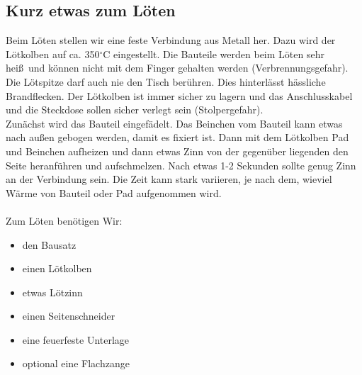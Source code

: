 \documentclass[a4paper]{article}
\begin{document}
\subsection{Kurz etwas zum Löten}
Beim Löten stellen wir eine feste Verbindung aus Metall her. Dazu wird der Lötkolben auf ca. 350$^{\circ}$C eingestellt. Die Bauteile werden beim Löten sehr hei\ss \ und können nicht mit dem Finger gehalten werden (Verbrennungsgefahr). Die Lötspitze darf auch nie den Tisch berühren. Dies hinterlässt hässliche Brandflecken. Der Lötkolben ist immer sicher zu lagern und das Anschlusskabel und die Steckdose sollen sicher verlegt sein (Stolpergefahr).\\
Zunächst wird das Bauteil eingefädelt. Das Beinchen vom Bauteil kann etwas nach au\ss en gebogen werden, damit es fixiert ist. Dann mit dem Lötkolben Pad und Beinchen aufheizen und dann etwas Zinn von der gegenüber liegenden den Seite heranführen und aufschmelzen. Nach etwas 1-2 Sekunden sollte genug Zinn an der Verbindung sein. Die Zeit kann stark variieren, je nach dem, wieviel Wärme von Bauteil oder Pad aufgenommen wird.\\
\ \\
Zum Löten benötigen Wir:
\begin{itemize}
  \item     den Bausatz
  \item     einen Lötkolben
  \item     etwas Lötzinn
  \item     einen Seitenschneider
  \item     eine feuerfeste Unterlage
  \item     optional eine Flachzange
\end{itemize}
\end{document}
